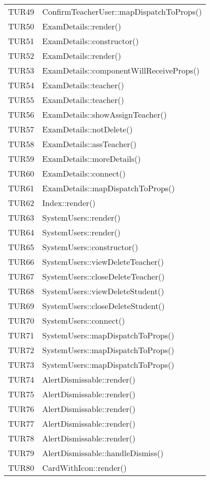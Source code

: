 \documentclass[PianoDiQualifica.tex]{subfiles}
\begin{document}
\begin{longtable}[H]{P{5cm}P{9cm}}
	TUR49 & ConfirmTeacherUser::mapDispatchToProps() \\ 
	TUR50 & ExamDetails::render() \\ 
	TUR51 & ExamDetails::constructor() \\ 
	TUR52 & ExamDetails::render() \\ 
	TUR53 & ExamDetails::componentWillReceiveProps() \\ 
	TUR54 & ExamDetails::teacher() \\ 
	TUR55 & ExamDetails::teacher() \\ 
	TUR56 & ExamDetails::showAssignTeacher() \\ 
	TUR57 & ExamDetails::notDelete() \\ 
	TUR58 & ExamDetails::assTeacher() \\ 
	TUR59 & ExamDetails::moreDetails() \\ 
	TUR60 & ExamDetails::connect() \\ 
	TUR61 & ExamDetails::mapDispatchToProps() \\ 
	TUR62 & Index::render() \\ 
	TUR63 & SystemUsers::render() \\ 
	TUR64 & SystemUsers::render() \\ 
	TUR65 & SystemUsers::constructor() \\ 
	TUR66 & SystemUsers::viewDeleteTeacher() \\ 
	TUR67 & SystemUsers::closeDeleteTeacher() \\ 
	TUR68 & SystemUsers::viewDeleteStudent() \\ 
	TUR69 & SystemUsers::closeDeleteStudent() \\ 
	TUR70 & SystemUsers::connect() \\ 
	TUR71 & SystemUsers::mapDispatchToProps() \\ 
	TUR72 & SystemUsers::mapDispatchToProps() \\ 
	TUR73 & SystemUsers::mapDispatchToProps() \\ 
	TUR74 & AlertDismissable::render() \\ 
	TUR75 & AlertDismissable::render() \\ 
	TUR76 & AlertDismissable::render() \\ 
	TUR77 & AlertDismissable::render() \\ 
	TUR78 & AlertDismissable::render() \\ 
	TUR79 & AlertDismissable::handleDismiss() \\ 
	TUR80 & CardWithIcon::render() \\ 

\end{longtable}
\end{document}
